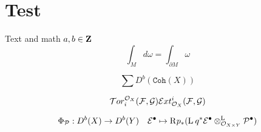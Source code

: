 \section{Test}
Text and math $a, b \in \Z$
\[
\int_{M} d\omega = \int_{\partial M } \omega
\]

\[
    \sum D^b(\mathtt{Coh}(X))
\]

\[
\localtor{i}{\F}{\G}{\mathcal O_X} \\
\localext{i}{\F}{\G}{\mathcal O_X}
\]

\[
    \Phi_\mathcal P : D^b(X) \to D^b(Y) \quad \mathcal E^\bullet \mapsto \rderived{}{p_*}(\derivedtensor{\lderived{}{q^*}\mathcal E^\bullet}{\mathcal P^\bullet}{\mathcal O_{X \times Y}})
\]







